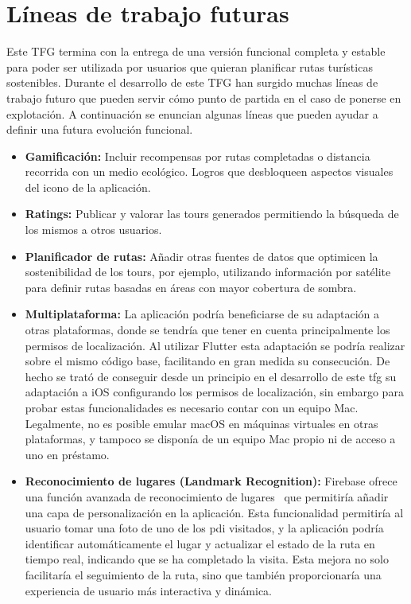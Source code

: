 \section*{Líneas de trabajo futuras}
Este TFG termina con la entrega de una versión funcional completa y estable para poder ser utilizada por usuarios que quieran planificar rutas turísticas sostenibles. Durante el desarrollo de este TFG han surgido muchas líneas de trabajo futuro que pueden servir cómo punto de partida en el caso de ponerse en explotación. A continuación se enuncian algunas líneas que pueden ayudar a definir una futura evolución funcional.
\begin{itemize}
    \item \textbf{Gamificación:} Incluir recompensas por rutas completadas o distancia recorrida con un medio ecológico. Logros que desbloqueen aspectos visuales del icono de la aplicación.
    \item \textbf{Ratings:} Publicar y valorar las tours generados permitiendo la búsqueda de los mismos a otros usuarios.
    \item \textbf{Planificador de rutas:} Añadir otras fuentes de datos que optimicen la sostenibilidad de los tours, por ejemplo, utilizando información por satélite para definir rutas basadas en áreas con mayor cobertura de sombra.
    \item \textbf{Multiplataforma:} La aplicación podría beneficiarse de su adaptación a otras plataformas, donde se tendría que tener en cuenta principalmente los permisos de localización. Al utilizar Flutter esta adaptación se podría realizar sobre el mismo código base, facilitando en gran medida su consecución. De hecho se trató de conseguir desde un principio en el desarrollo de este \acrlong{tfg} su adaptación a iOS configurando los permisos de localización, sin embargo para probar estas funcionalidades es necesario contar con un equipo Mac. Legalmente, no es posible emular macOS en máquinas virtuales en otras plataformas, y tampoco se disponía de un equipo Mac propio ni de acceso a uno en préstamo. 
	\item \textbf{Reconocimiento de lugares (Landmark Recognition):} Firebase ofrece una función avanzada de reconocimiento de lugares~\cite{firebase_mlkit_landmarks} que permitiría añadir una capa de personalización en la aplicación. Esta funcionalidad permitiría al usuario tomar una foto de uno de los \acrlong{pdi} visitados, y la aplicación podría identificar automáticamente el lugar y actualizar el estado de la ruta en tiempo real, indicando que se ha completado la visita. Esta mejora no solo facilitaría el seguimiento de la ruta, sino que también proporcionaría una experiencia de usuario más interactiva y dinámica.

\end{itemize}
